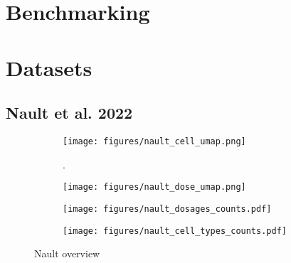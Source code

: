 \section{Benchmarking}
\label{ch:chapter1}

\clearpage


\section{Datasets}

\subsection{Nault et al. 2022}

\begin{figure}[h]
    \centering
    \begin{subfigure}[t]{0.49\textwidth}
        \centering
        \texttt{[image: figures/nault\_cell\_umap.png]}
        \caption{}
        \label{fig:figure1}.
    \end{subfigure}%
    \hfill
    \begin{subfigure}[t]{0.49\textwidth}
        \centering
        \texttt{[image: figures/nault\_dose\_umap.png]}
        \caption{}
        \label{fig:figure2}
    \end{subfigure}%
    \hfill
    \begin{subfigure}[b]{\textwidth}
        \centering
        \texttt{[image: figures/nault\_dosages\_counts.pdf]}
        \caption{}
        \label{fig:figure3}
    \end{subfigure}
    \hfill
    \begin{subfigure}[b]{\textwidth}
        \centering
        \texttt{[image: figures/nault\_cell\_types\_counts.pdf]}
        \caption{}
        \label{fig:figure4}
    \end{subfigure}    
    \caption{Nault overview}
    \label{fig:combined}
\end{figure}



